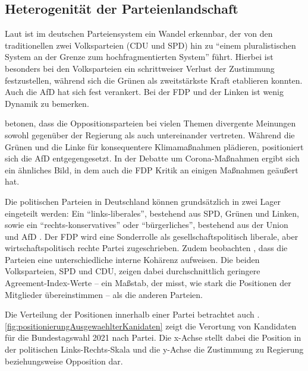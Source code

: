 \subsection{Heterogenität der Parteienlandschaft} \label{subsec:heterogenitätParteien}

Laut \textcite{niedermayer_entwicklung_2020} ist im deutschen Parteiensystem ein Wandel erkennbar, der von den traditionellen zwei Volksparteien (\ac{CDU} und \ac{SPD}) hin zu \enquote{einem pluralistischen System an der Grenze zum hochfragmentierten System} führt. Hierbei ist besonders bei den Volksparteien ein schrittweiser Verlust der Zustimmung festzustellen, während sich die Grünen als zweitstärkste Kraft etablieren konnten. Auch die \ac{AfD} hat sich fest verankert. Bei der \ac{FDP} und der Linken ist wenig Dynamik zu bemerken.

\textcite{engler_wettbewerb_2022} betonen, dass die Oppositionsparteien bei vielen Themen divergente Meinungen sowohl gegenüber der Regierung als auch untereinander vertreten. Während die Grünen und die Linke für konsequentere Klimamaßnahmen plädieren, positioniert sich die \ac{AfD} entgegengesetzt. In der Debatte um Corona-Maßnahmen ergibt sich ein ähnliches Bild, in dem auch die \ac{FDP} Kritik an einigen Maßnahmen geäußert hat.

Die politischen Parteien in Deutschland können grundsätzlich in zwei Lager eingeteilt werden: Ein \enquote{links-liberales}, bestehend aus \ac{SPD}, Grünen und Linken, sowie ein \enquote{rechts-konservatives} oder \enquote{bürgerliches}, bestehend aus der Union und \ac{AfD} \autocite{thomeczek_politische_2019}. Der \ac{FDP} wird eine Sonderrolle als gesellschaftspolitisch liberale, aber wirtschaftspolitisch rechte Partei zugeschrieben. Zudem beobachten \textcite{thomeczek_politische_2019}, dass die Parteien eine unterschiedliche interne Kohärenz aufweisen. Die beiden Volksparteien, \ac{SPD} und \ac{CDU}, zeigen dabei durchschnittlich geringere Agreement-Index-Werte -- ein Maßstab, der misst, wie stark die Positionen der Mitglieder übereinstimmen -- als die anderen Parteien.

Die Verteilung der Positionen innerhalb einer Partei betrachtet auch \textcite{saltzer_bundestagswahl_2022}. \autoref{fig:positionierungAusgewaehlterKanidaten} zeigt die Verortung von Kandidaten für die Bundestagswahl \num{2021} nach Partei. Die x-Achse stellt dabei die Position in der politischen Links-Rechts-Skala und die y-Achse die Zustimmung zu Regierung beziehungsweise Opposition dar.

